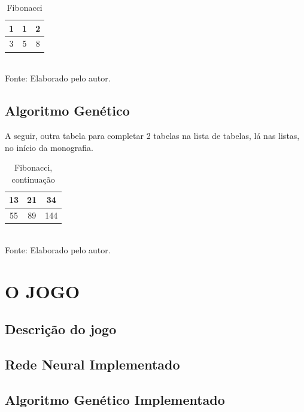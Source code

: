 \documentclass[12pt,a4paper]{article}
\newcommand{\source}[1]{Fonte: {#1}}
\begin{document}
\begin{table}[ht]
	\label{tabela1}
	\caption{Fibonacci}
	\centering
	\vspace{3mm}
	\begin{tabular}{|c|c|c|}
		\hline 
		1 & 1 & 2 \\ 
		\hline 
		3 & 5 & 8 \\ 
		\hline 
	\end{tabular} \\
	\vspace{3mm}
	\source{Elaborado pelo autor.}
\end{table}

	\subsection{Algoritmo Genético}
	A seguir, outra tabela para completar 2 tabelas na lista de tabelas, lá nas listas, no início da monografia.

\begin{table}[ht]
	\label{tabela2}
	\caption{Fibonacci, continuação}
	\centering
	\vspace{3mm}
	\begin{tabular}{|c|c|c|}
		\hline 
		13 & 21 & 34 \\ 
		\hline 
		55 & 89 & 144 \\ 
		\hline 
	\end{tabular} \\
	\vspace{3mm}
	\source{Elaborado pelo autor.}
\end{table}

\section{O JOGO}
	
	\subsection{Descrição do jogo}
	
	\subsection{Rede Neural Implementado}
	
	\subsection{Algoritmo Genético Implementado}
	
\end{document}
